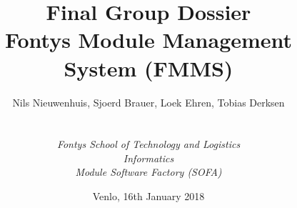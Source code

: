
\def\Company{Fontys Sofa Group 1}
\def\Institute{\textit{Fontys School of Technology and Logistics}}
\def\Course{\textit{Informatics}}
\def\Module{\textit{Module Software Factory (SOFA)}}

\def\BoldTitle{Final Group Dossier}
\def\Subtitle{Fontys Module Management System (FMMS)}
\def\Authors{Nils Nieuwenhuis, Sjoerd Brauer, Loek Ehren, Tobias Derksen}


\title{\textbf{\BoldTitle}\\\Subtitle}
\author{\Authors \\ \\ \\ \Institute\\ \Course\\ \Module}
\date{Venlo, 16th January 2018}
